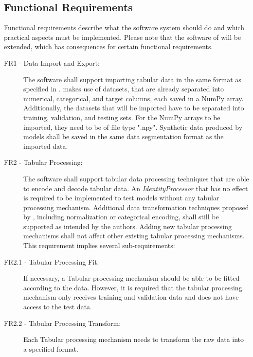 \subsection*{Functional Requirements}
\label{sec:func_requirements}
Functional requirements describe what the software system should do and which practical aspects must be implemented.
Please note that the software of \cite{kotelnikov2022TabDDPMModellingTabular} will be extended, which has consequences for certain functional requirements.

\begin{description}
	\item[FR1 - Data Import and Export:]
		The software shall support importing tabular data in the same format as specified in \cite{kotelnikov2022TabDDPMModellingTabular}.
		\textcite{kotelnikov2022TabDDPMModellingTabular} makes use of datasets, that are already separated into numerical, categorical, and target columns, each saved in a NumPy \cite{harris2020array} array.
		Additionally, the datasets that will be imported have to be separated into training, validation, and testing sets.
		For the NumPy arrays to be imported, they need to be of file type ".npy".
		Synthetic data produced by \glspl{model} shall be saved in the same data segmentation format as the imported data.

	\item[FR2 - Tabular Processing:]
		The software shall support tabular data processing techniques that are able to encode and decode tabular data.
		An \textit{IdentityProcessor} that has no effect is required to be implemented to test \glspl{model} without any tabular processing mechanism.
		Additional data transformation techniques proposed by \cite{kotelnikov2022TabDDPMModellingTabular}, including normalization or categorical encoding, shall still be supported as intended by the authors.
		Adding new tabular processing mechanisms shall not affect other existing tabular processing mechanisms. This requirement implies several sub-requirements: 

		\item[FR2.1 - Tabular Processing Fit:]
		If necessary, a Tabular processing mechanism should be able to be fitted according to the data.
		However, it is required that the tabular processing mechanism only receives training and validation data and does not have access to the test data.

		\item[FR2.2 - Tabular Processing Transform:]
		Each Tabular processing mechanism needs to transform the raw data into a specified format.


\end{description}
